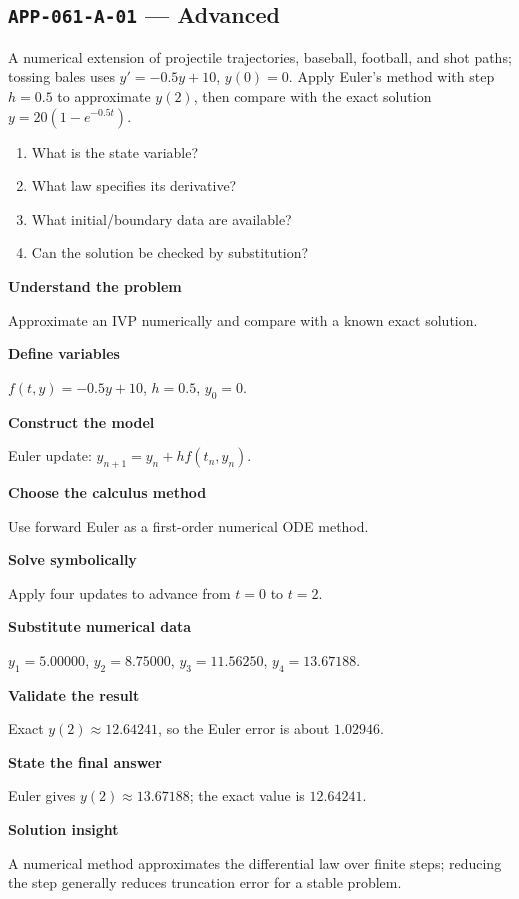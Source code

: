 \documentclass[11pt]{book}
\newcommand{\pid}[1]{\texttt{#1}}
\begin{document}
\subsection*{\pid{APP-061-A-01} — Advanced}
\begin{problembox}
A numerical extension of projectile trajectories, baseball, football, and shot paths; tossing bales uses $y'=-0.5y+10$, $y(0)=0$. Apply Euler's method with step $h=0.5$ to approximate $y(2)$, then compare with the exact solution $y=20(1-e^{-0.5t})$.
\end{problembox}
\begin{promptbox}\begin{enumerate}
\item What is the state variable?
\item What law specifies its derivative?
\item What initial/boundary data are available?
\item Can the solution be checked by substitution?
\end{enumerate}\end{promptbox}
\begin{solutionbox}
\textbf{Understand the problem}\par Approximate an IVP numerically and compare with a known exact solution.\par\medskip
\textbf{Define variables}\par $f(t,y)=-0.5y+10$, $h=0.5$, $y_0=0$.\par\medskip
\textbf{Construct the model}\par Euler update: $y_{n+1}=y_n+h f(t_n,y_n)$.\par\medskip
\textbf{Choose the calculus method}\par Use forward Euler as a first-order numerical ODE method.\par\medskip
\textbf{Solve symbolically}\par Apply four updates to advance from $t=0$ to $t=2$.\par\medskip
\textbf{Substitute numerical data}\par $y_1=5.00000$, $y_2=8.75000$, $y_3=11.56250$, $y_4=13.67188$.\par\medskip
\textbf{Validate the result}\par Exact $y(2)\approx 12.64241$, so the Euler error is about $1.02946$.\par\medskip
\textbf{State the final answer}\par Euler gives $y(2)\approx 13.67188$; the exact value is $12.64241$.\par\medskip
\textbf{Solution insight}\par A numerical method approximates the differential law over finite steps; reducing the step generally reduces truncation error for a stable problem.\par\medskip
\end{solutionbox}
\end{document}
